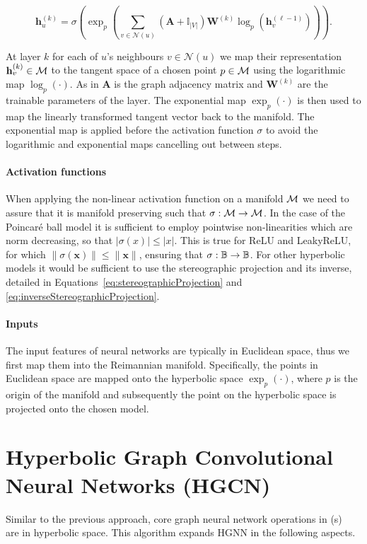 \begin{equation}\label{eq:HGNNgraphlevel}
    \mathbf{h}^{(k)}_u = \sigma\left(\exp_p\left(\sum_{v\in\mathcal{N}(u)}\left(\mathbf{A} + \mathbb{I}_{|V|}\right)\mathbf{W}^{(k)}\log_p\left(\mathbf{h}^{(\ell-1)}_v\right)\right)\right).
\end{equation}

At layer $k$ for each of $u$'s neighbours $v\in\mathcal{N}(u)$ we map their representation $\mathbf{h}^{(k)}_v\in \mathcal{M}$ to the tangent space of a chosen point $p\in \mathcal{M}$ using the logarithmic map $\log_p(\cdot)$. As in  $\mathbf{A}$ is the graph adjacency matrix and $\mathbf{W}^{(k)}$ are the trainable parameters of the layer. The exponential map $\exp_p(\cdot)$ is then used to map the linearly transformed tangent vector back to the manifold. The exponential map is applied before the activation function $\sigma$ to avoid the logarithmic and exponential maps cancelling out between steps. 

\paragraph{Activation functions}
When applying the non-linear activation function on a manifold $\mathcal{M}$ we need to assure that it is manifold preserving such that $\sigma: \mathcal{M}\to\mathcal{M}$. In the case of the Poincaré ball model it is sufficient to employ pointwise non-linearities which are norm decreasing, so that $|\sigma(x)|\leq |x|$. This is true for ReLU and LeakyReLU, for which $\|\sigma(\mathbf{x})\|\leq \|\mathbf{x}\|$, ensuring that $\sigma: \mathbb{B}\to \mathbb{B}$. For other hyperbolic models it would be sufficient to use the stereographic projection and its inverse, detailed in Equations~\ref{eq:stereographicProjection} and \ref{eq:inverseStereographicProjection}.

\paragraph{Inputs}
The input features of neural networks are typically in Euclidean space, thus we first map them into the Reimannian manifold. Specifically, the points in Euclidean space are mapped onto the hyperbolic space $\exp_p(\cdot)$, where $p$ is the origin of the manifold and subsequently the point on the hyperbolic space is projected onto the chosen model.

\section{Hyperbolic Graph Convolutional Neural Networks (HGCN)}
Similar to the previous approach, core graph neural network operations in  (s)~\cite{chami2019HGCN} are in hyperbolic space. This algorithm expands HGNN in the following aspects.

